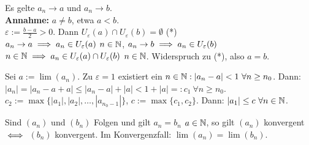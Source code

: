 \documentclass[a4paper,twoside,DIV15,BCOR12mm]{scrbook}
\begin{document}
\begin{beweise}
\item Es gelte $a_n \to a$ und $a_n \to b$. \\
\textbf{Annahme:} $a \ne b$, etwa $a < b$.\\
$\varepsilon := \frac{b-a}2 > 0$. Dann $U_\varepsilon(a) \cap U_\varepsilon(b) = \emptyset$ (*)\\
$a_n \to a \implies a_n \in U_\varepsilon(a) $ \ffa  $n \in \mathbb{N}$, $a_n \to b \implies a_n \in U_\varepsilon(b)$ \ffa $n \in \mathbb{N} \implies a_n \in U_\varepsilon(a) \cap U_\varepsilon(b)$ \ffa $n\in\mathbb{N}$. Widerspruch zu (*), also $a = b$.
\item Sei $a := \lim(a_n)$. Zu $\varepsilon = 1$ existiert ein $n\in\MdN: |a_n - a | < 1\ \forall n\ge n_0$. Dann: $|a_n| = |a_n - a + a| \le |a_n -a| + |a| < 1 + |a| =: c_1 \ \forall n \ge n_0$. $c_2 := \max\{|a_1|,|a_2|,\ldots,|a_{n_0-1}|\}$, $c := \max\{c_1,c_2\}$. Dann: $|a_1| \le c \ \forall n\in\mathbb{N}$.
\end{beweise}

\begin{bemerkung}
Sind $(a_n)$ und $(b_n)$ Folgen und gilt $a_n = b_n$ \ffa $a\in\mathbb{N}$, so gilt $(a_n)$ konvergent $\iff$ $(b_n)$ konvergent. Im Konvergenzfall: $\lim(a_n) = \lim(b_n)$.
\end{bemerkung}
\end{document}

